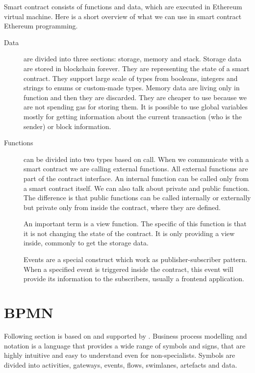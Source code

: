 \documentclass[thesis=M,english]{FITthesis}[2019/12/23]
\begin{document}
Smart contract consists of functions and data, which are executed in Ethereum virtual machine. Here is a short overview of what we can use in smart contract Ethereum programming.
\begin{description}

\item[Data] are divided into three sections: storage, memory and stack. Storage data are stored in blockchain forever. They are representing the state of a smart contract. They support large scale of types from booleans, integers and strings to enums or custom-made types. Memory data are living only in function and then they are discarded. They are cheaper to use because we are not spending gas for storing them. It is possible to use global variables mostly for getting information about the current transaction (who is the sender) or block information.\cite{RichardsJanuary202021}
\item[Functions] can be divided into two types based on call. When we communicate with a smart contract we are calling external functions. All external functions are part of the contract interface. An internal function can be called only from a smart contract itself. We can also talk about private and public function. The difference is that public functions can be called internally or externally but private only from inside the contract, where they are defined.

An important term is a view function. The specific of this function is that it is not changing the state of the contract. It is only providing a view inside, commonly to get the storage data.
 
Events are a special construct which work as publisher-subscriber pattern. When a specified event is triggered inside the contract, this event will provide its information to the subscribers, usually a frontend application.\cite{RichardsJanuary202021}
\end{description}



\section{BPMN}

Following section is based on \cite{quickBPNMguide} and supported by \cite{manualBPNM}. Business process modelling and notation is a language that provides a wide range of symbols and signs, that are highly intuitive and easy to understand even for non-specialists. Symbols are divided into activities, gateways, events, flows, swimlanes, artefacts and data. 
\end{document}
